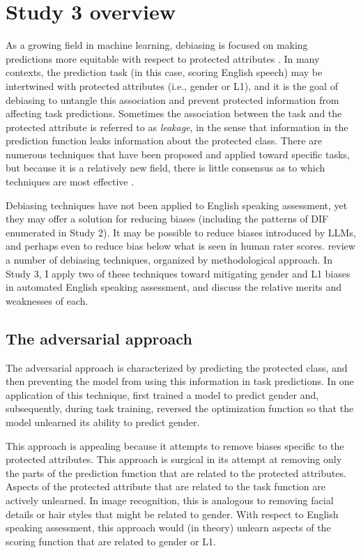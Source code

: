\documentclass [PhD] {uclathes}
\begin{document}
\section{Study 3 overview}

As a growing field in machine learning, debiasing is focused on making predictions more equitable with respect to protected attributes \citep{elazar2018adversarial}. In many contexts, the prediction task (in this case, scoring English speech) may be intertwined with protected attributes (i.e., gender or L1), and it is the goal of debiasing to untangle this association and prevent protected information from affecting task predictions. Sometimes the association between the task and the protected attribute is referred to as \emph{leakage}, in the sense that information in the prediction function leaks information about the protected class. There are numerous techniques that have been proposed and applied toward specific tasks, but because it is a relatively new field, there is little consensus as to which techniques are most effective \citep{sun2019mitigating}. 

Debiasing techniques have not been applied to English speaking assessment, yet they may offer a solution for reducing biases (including the patterns of DIF enumerated in Study 2). It may be possible to reduce biases introduced by LLMs, and perhaps even to reduce bias below what is seen in human rater scores. \citet{sun2019mitigating} review a number of debiasing techniques, organized by methodological approach. In Study 3, I apply two of these techniques toward mitigating gender and L1 biases in automated English speaking assessment, and discuss the relative merits and weaknesses of each. 

\subsection{The adversarial approach}

The adversarial approach is characterized by predicting the protected class, and then preventing the model from using this information in task predictions. In one application of this technique, \citet{wang2019balanced} first trained a model to predict gender and, subsequently, during task training, reversed the optimization function so that the model unlearned its ability to predict gender. 

This approach is appealing because it attempts to remove biases specific to the protected attributes. This approach is surgical in its attempt at removing only the parts of the prediction function that are related to the protected attributes. Aspects of the protected attribute that are related to the task function are actively unlearned. In image recognition, this is analogous to removing facial details or hair styles that might be related to gender. With respect to English speaking assessment, this approach would (in theory) unlearn aspects of the scoring function that are related to gender or L1. 
\end{document}
